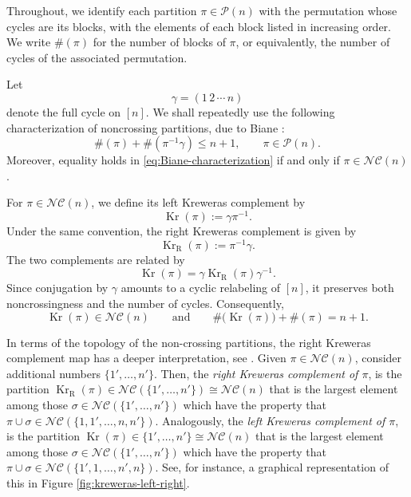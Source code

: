 \documentclass{article}
\theoremstyle{definition}
\newcommand{\cP}{\mathcal{P}}
\newcommand{\NC}{\mathcal{NC}}
\begin{document}

Throughout, we identify each partition \(\pi\in\cP(n)\) with the
permutation whose cycles are its blocks, with the elements of each
block listed in increasing order. We write \(\#(\pi)\) for the number
of blocks of \(\pi\), or equivalently, the number of cycles of the
associated permutation.

Let
\[
\gamma=(1\,2\,\cdots\,n)
\]
denote the full cycle on \([n]\). We shall repeatedly use the following
characterization of noncrossing partitions, due to Biane
\cite{Biane97}:
\begin{equation}\label{eq:Biane-characterization}
\#(\pi)+\#(\pi^{-1}\gamma)
\leq n+1,
\qquad \pi\in\cP(n).
\end{equation}
Moreover, equality holds in \eqref{eq:Biane-characterization} if and
only if \(\pi\in\NC(n)\).

For \(\pi\in\NC(n)\), we define its left Kreweras complement by
\[
\operatorname{Kr}(\pi):=\gamma\pi^{-1}.
\]
Under the same convention, the right Kreweras complement is given by
\[
\operatorname{Kr}_{\mathrm R}(\pi):=\pi^{-1}\gamma.
\]
The two complements are related by
\[
\operatorname{Kr}(\pi)
=
\gamma\operatorname{Kr}_{\mathrm R}(\pi)\gamma^{-1}.
\]
Since conjugation by \(\gamma\) amounts to a cyclic relabeling of
\([n]\), it preserves both noncrossingness and the number of cycles.
Consequently,
\[
\operatorname{Kr}(\pi)\in\NC(n)
\qquad\text{and}\qquad
\#\bigl(\operatorname{Kr}(\pi)\bigr)+\#(\pi)=n+1.
\]

In terms of the topology of the non-crossing partitions, the right Kreweras complement map has a deeper interpretation, see \cite[Exercise 18.25]{NS06}. Given $\pi\in \NC(n)$, consider additional numbers $\{1',\dots,n'\}$. Then, the \emph{right Kreweras complement of  $\pi$}, is the partition $\operatorname{Kr}_{\mathrm R}(\pi)\in \NC(\{1',\dots,n'\})\cong \NC(n)$ that is the largest element among those $\sigma\in\NC(\{1',\dots,n'\})$ which have the property that $\pi\cup \sigma\in \NC(\{1,1',\dots,n,n'\})$. Analogously, the \emph{left Kreweras complement of  $\pi$}, is the partition $\operatorname{Kr}(\pi)\in \{1',\dots,n'\}\cong \NC(n)$ that is the largest element among those $\sigma\in\NC(\{1',\dots,n'\})$ which have the property that $\pi\cup \sigma\in \NC(\{1',1,\dots,n',n\})$. See, for instance, a graphical representation of this in Figure \ref{fig:kreweras-left-right}.
\end{document}

